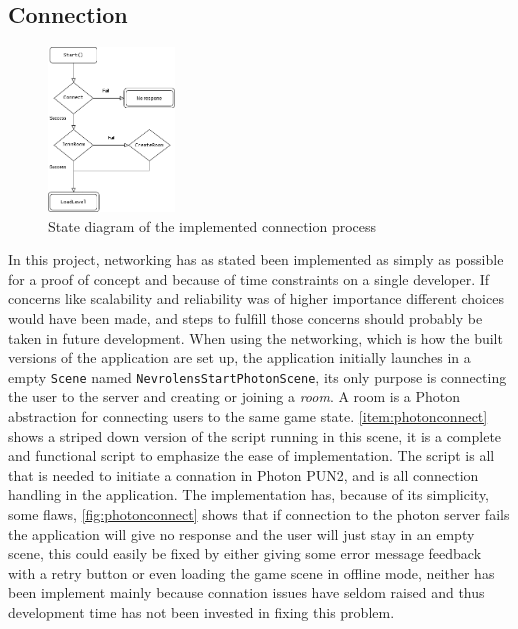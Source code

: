 \subsection*{Connection}

\begin{figure} 
    \centering
    \includegraphics[width=0.3\textwidth]{fig/photonconnectiondiagram2.png}
    \caption{State diagram of the implemented connection process}
    \vspace{30pt}
    \label{fig:photonconnect}
\end{figure}
In this project, networking has as stated been implemented as simply as possible for a proof of concept and because of time constraints on a single developer. If concerns like scalability and reliability was of higher importance different choices would have been made, and steps to fulfill those concerns should probably be taken in future development.
When using the networking, which is how the built versions of the application are set up, the application initially launches in a empty \texttt{Scene} named \texttt{NevrolensStartPhotonScene}, its only purpose is connecting the user to the server and creating or joining a \textit{room}. A room is a Photon abstraction for connecting users to the same game state. \autoref{item:photonconnect} shows a striped down version of the script running in this scene, it is a complete and functional script to emphasize the ease of implementation. The script  is all that is needed to initiate a connation in Photon PUN2, and is all connection handling in the application. The implementation has, because of its simplicity, some flaws, \autoref{fig:photonconnect} shows that if connection to the photon server fails the application will give no response and the user will just stay in an empty scene, this could easily be fixed by either giving some error message feedback with a retry button or even loading the game scene in offline mode, neither has been implement mainly because connation issues have seldom raised and thus development time has not been invested in fixing this problem. 

